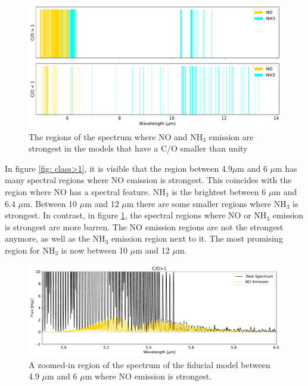\documentclass[oneside, single, authoryear, semicolon]{lion-msc}
\newcommand{\4}{$_4$}
\newcommand{\3}{$_3$}
\newcommand{\2}{$_2$}
\begin{document}

\begin{figure}[!ht]
    \centering
    \includegraphics[width=\linewidth]{Figures/ClassificationCO.pdf}
    \caption{The regions of the spectrum where NO and NH\3 emission are strongest in the models that have a C/O smaller than unity}
    \label{fig: class<1}
\end{figure}

In figure \ref{fig: class>1}, it is visible that the region between 4.9$\mu$m and 6 $\mu$m has many spectral regions where NO emission is strongest. This coincides with the region where NO has a spectral feature. NH\3 is the brightest between 6 $\mu$m and 6.4 $\mu$m. Between 10 $\mu$m and 12 $\mu$m there are some smaller regions where NH\3 is strongest. In contrast, in figure \ref{fig: class<1}, the spectral regions where NO or NH\3 emission is strongest are more barren. The NO emission regions are not the strongest anymore, as well as the NH\3 emission region next to it. The most promising region for NH\3 is now between 10 $\mu$m and 12 $\mu$m. 

\begin{figure}[!ht]
    \centering
    \includegraphics[width=\linewidth]{Figures/NO_region.pdf}
    \caption{A zoomed-in region of the spectrum of the fiducial model between 4.9 $\mu$m and 6 $\mu$m where NO emission is strongest.}
    \label{fig: NO region}
\end{figure}
\end{document}
